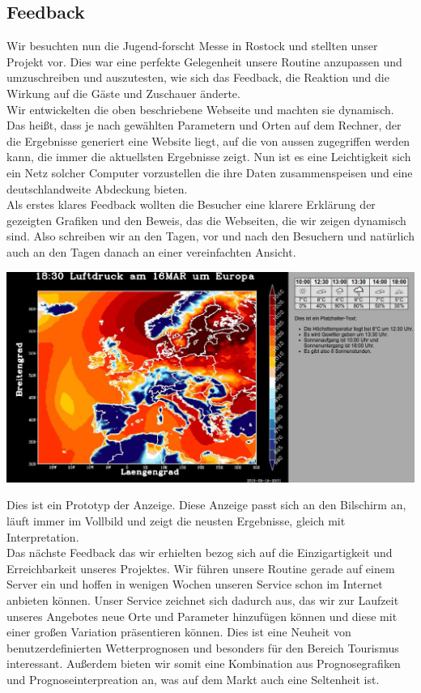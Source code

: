 \documentclass[a4paper,oneside,12pt,titlepage]{article}
\begin{document}
\subsection{Feedback}
Wir besuchten nun die Jugend-forscht Messe in Rostock und stellten unser Projekt vor. Dies war eine perfekte Gelegenheit unsere Routine anzupassen und umzuschreiben und auszutesten, wie sich das Feedback, die Reaktion und die Wirkung auf die Gäste und Zuschauer änderte.\\
Wir entwickelten die oben beschriebene Webseite und machten sie dynamisch. Das heißt, dass je nach gewählten Parametern und Orten auf dem Rechner, der die Ergebnisse generiert eine Website liegt, auf die von aussen zugegriffen werden kann, die immer die aktuellsten Ergebnisse zeigt. Nun ist es eine Leichtigkeit sich ein Netz solcher Computer vorzustellen die ihre Daten zusammenspeisen und eine deutschlandweite Abdeckung bieten.\\ 
Als erstes klares Feedback wollten die Besucher eine klarere Erklärung der gezeigten Grafiken und den Beweis, das die Webseiten, die wir zeigen dynamisch sind. Also schreiben wir an den Tagen, vor und nach den Besuchern und natürlich auch an den Tagen danach an einer vereinfachten Ansicht.
\begin{center}
\includegraphics[width=1\linewidth]{display.png} 
\end{center} 
Dies ist ein Prototyp der Anzeige. Diese Anzeige passt sich an den Bilschirm an, läuft immer im Vollbild und zeigt die neusten Ergebnisse, gleich mit Interpretation.\\
Das nächste Feedback das wir erhielten bezog sich auf die Einzigartigkeit und Erreichbarkeit unseres Projektes. Wir führen unsere Routine gerade auf einem Server ein und hoffen in wenigen Wochen unseren Service schon im Internet anbieten können. Unser Service zeichnet sich dadurch aus, das wir zur Laufzeit unseres Angebotes neue Orte und Parameter hinzufügen können und diese mit einer großen Variation präsentieren können. Dies ist eine Neuheit von benutzerdefinierten Wetterprognosen und besonders für den Bereich Tourismus interessant. Außerdem bieten wir somit eine Kombination aus Prognosegrafiken und Prognoseinterpreation an, was auf dem Markt auch eine Seltenheit ist.
\end{document}
